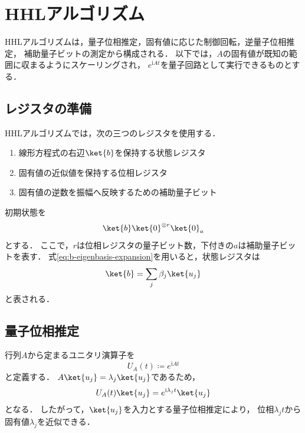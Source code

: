 \section{HHLアルゴリズム}
\label{sec:hhl-algorithm}

HHLアルゴリズムは，量子位相推定，固有値に応じた制御回転，逆量子位相推定，
補助量子ビットの測定から構成される\cite{shimada2020}．
以下では，$A$の固有値が既知の範囲に収まるようにスケーリングされ，
$e^{\mathrm{i}At}$を量子回路として実行できるものとする．

\subsection{レジスタの準備}
\label{subsec:hhl-register-preparation}

HHLアルゴリズムでは，次の三つのレジスタを使用する．

\begin{enumerate}[(1)]
  \item 線形方程式の右辺$\ket{b}$を保持する状態レジスタ
  \item 固有値の近似値を保持する位相レジスタ
  \item 固有値の逆数を振幅へ反映するための補助量子ビット
\end{enumerate}

初期状態を
\begin{align*}
  \ket{b}\ket{0}^{\otimes r}\ket{0}_{a}
\end{align*}
とする．
ここで，$r$は位相レジスタの量子ビット数，下付きの$a$は補助量子ビットを表す．
式\eqref{eq:b-eigenbasis-expansion}を用いると，状態レジスタは
\begin{align*}
  \ket{b}
  =
  \sum_j\beta_j\ket{u_j}
\end{align*}
と表される．

\subsection{量子位相推定}
\label{subsec:hhl-quantum-phase-estimation}

行列$A$から定まるユニタリ演算子を
\begin{equation}
  U_A(t)
  \coloneq
  e^{\mathrm{i}At}
  \label{eq:hamiltonian-simulation-unitary}
\end{equation}
と定義する．
$A\ket{u_j}=\lambda_j\ket{u_j}$であるため，
\begin{align*}
  U_A(t)\ket{u_j}
  =
  e^{\mathrm{i}\lambda_jt}\ket{u_j}
\end{align*}
となる．
したがって，$\ket{u_j}$を入力とする量子位相推定により，
位相$\lambda_jt$から固有値$\lambda_j$を近似できる．

